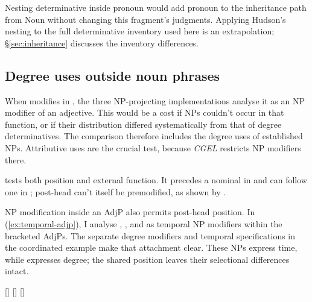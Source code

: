 \documentclass[12pt]{article}
\begin{document}
Nesting determinative inside pronoun would add pronoun to the inheritance path from Noun without changing this fragment's judgments. Applying Hudson's nesting to the full determinative inventory used here is an extrapolation; §\ref{sec:inheritance} discusses the inventory differences.

\subsection{Degree uses outside noun phrases}\label{sec:enough}

When  modifies  in , the three NP-projecting implementations analyse it as an NP modifier of an adjective. This would be a cost if NPs couldn't occur in that function, or if their distribution differed systematically from that of degree determinatives. The comparison therefore includes the degree uses of established NPs. Attributive uses are the crucial test, because \textit{CGEL} restricts NP modifiers there.

 tests both position and external function. It precedes a nominal in  and can follow one in ; post-head  can't itself be premodified, as shown by  \citep[396--397, 445]{huddleston2002}.

NP modification inside an AdjP also permits post-head position. In (\ref{ex:temporal-adjp}), I analyse , , and  as temporal NP modifiers within the bracketed AdjPs. The separate degree modifiers and temporal specifications in the coordinated example make that attachment clear. These NPs express time, while  expresses degree; the shared position leaves their selectional differences intact.

\ea\label{ex:temporal-adjp}
\ea {} [] 
\ex {} []  [] 
\z\z
\end{document}
